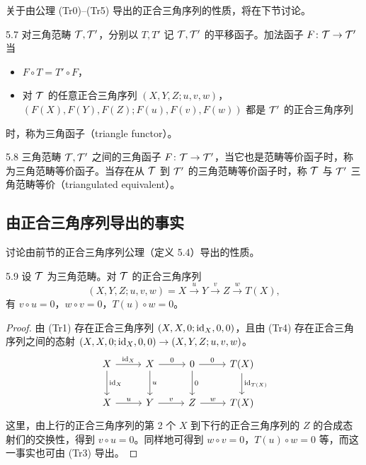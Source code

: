 关于由公理 (Tr0)–(Tr5) 导出的正合三角序列的性质，将在下节讨论。


\begin{definition}{5.7}
对三角范畴 $\mathcal{T},\mathcal{T}'$，分别以 $T,T'$ 记 $\mathcal{T},\mathcal{T}'$ 的平移函子。加法函子 $F\colon\mathcal{T}\to\mathcal{T}'$ 当
\begin{itemize}[leftmargin=2em, itemsep=0.2em]
\item $F\circ T = T'\circ F$，
\item 对 $\mathcal{T}$ 的任意正合三角序列 $(X,Y,Z;u,v,w)$，$(F(X),F(Y),F(Z);F(u),F(v),F(w))$ 都是 $\mathcal{T}'$ 的正合三角序列
\end{itemize}
时，称为三角函子（triangle functor）。
\end{definition}

\begin{definition}{5.8}
三角范畴 $\mathcal{T},\mathcal{T}'$ 之间的三角函子 $F\colon\mathcal{T}\to\mathcal{T}'$，当它也是范畴等价函子时，称为三角范畴等价函子。当存在从 $\mathcal{T}$ 到 $\mathcal{T}'$ 的三角范畴等价函子时，称 $\mathcal{T}$ 与 $\mathcal{T}'$ 三角范畴等价（triangulated equivalent）。
\end{definition}

\subsection{由正合三角序列导出的事实}

讨论由前节的正合三角序列公理（定义 5.4）导出的性质。

\begin{lemma}{5.9}
设 $\mathcal{T}$ 为三角范畴。对 $\mathcal{T}$ 的正合三角序列
\[
(X,Y,Z;u,v,w) = X \xrightarrow{\,u\,} Y \xrightarrow{\,v\,} Z \xrightarrow{\,w\,} T(X),
\]
有 $v\circ u = 0$，$w\circ v = 0$，$T(u)\circ w = 0$。
\end{lemma}

\begin{proof}
由 (Tr1) 存在正合三角序列 $(X,X,0;\mathrm{id}_X,0,0)$，且由 (Tr4) 存在正合三角序列之间的态射 $(X,X,0;\mathrm{id}_X,0,0)\to(X,Y,Z;u,v,w)$。
\[
\begin{tikzcd}[row sep=2.2em, column sep=2.6em]
X \arrow[r,"\id_X"] \arrow[d,"\id_X"] & X \arrow[r,"0"] \arrow[d,"u"] & 0 \arrow[r,"0"] \arrow[d,"0"] & T(X) \arrow[d,"\id_{T(X)}"] \\
X \arrow[r,"u"] & Y \arrow[r,"v"] & Z \arrow[r,"w"] & T(X)
\end{tikzcd}
\]
这里，由上行的正合三角序列的第 2 个 $X$ 到下行的正合三角序列的 $Z$ 的合成态射们的交换性，得到 $v\circ u = 0$。同样地可得到 $w\circ v = 0$，$T(u)\circ w = 0$ 等，而这一事实也可由 (Tr3) 导出。
\end{proof}

